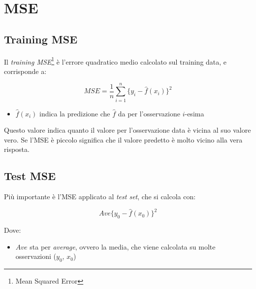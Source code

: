 \section{MSE}

\subsection{Training MSE}
Il \textit{training MSE}\footnote{Mean Squared Error} \`e l'errore quadratico 
medio calcolato sul training data, e corrisponde a:

\[ MSE = \frac{1}{n} \sum_{i=1}^n \{y_i - \hat{f}(x_i)\}^2 \]

\begin{itemize}
 \item $\hat{f}(x_i)$ indica la predizione che $\hat{f}$ da per l'osservazione 
$i$-esima
\end{itemize}


Questo valore indica quanto il valore per l'osservazione data \`e vicina al suo 
valore vero. Se l'MSE \`e piccolo significa che il valore predetto \`e molto 
vicino alla vera risposta.

\subsection{Test MSE}

Pi\`u importante \`e l'MSE applicato al \textit{test set}, che si calcola con:

\[ Ave\{y_0 - \hat{f}(x_0)\}^2 \]

Dove:
\begin{itemize}
 \item $Ave$ sta per \textit{average}, ovvero la media, che viene calcolata su 
molte osservazioni ($y_0$, $x_0$)
\end{itemize}